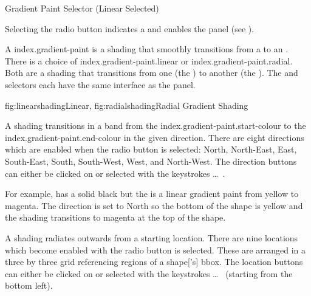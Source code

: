 
{}
{Gradient Paint Selector (Linear Selected)}

Selecting the  radio button indicates a 
 and enables the
 panel (see
). 

A \gls{index.gradient-paint} is a shading that smoothly transitions
from a  to an
.  There is a choice
of \gls{index.gradient-paint.linear} or
\gls{index.gradient-paint.radial}. Both are a shading that
transitions from one  (the
) to another (the
).  The
 and  selectors
each have the same interface as the  panel.

{
 {fig:linearshading}{}{Linear},
 {fig:radialshading}{}{Radial}
}
{Gradient Shading}


A  shading transitions in
a band from the \gls{index.gradient-paint.start-colour} to the
\gls{index.gradient-paint.end-colour} in the given direction. There
are eight directions which are enabled when the
 radio button is selected: North, North-East,
East, South-East, South, South-West, West, and North-West.  The
direction buttons can either be clicked on or selected with the
keystrokes  \ldots\
.

For example,  has a solid black
 but the  is a linear
gradient paint from yellow to magenta. The direction is set to North
so the bottom of the shape is yellow and the shading transitions to
magenta at the top of the shape.


A  shading radiates
outwards from a starting location. There are nine locations which
become enabled with the \widget{colour.radial} radio button is
selected. These are arranged in a three by three grid referencing
regions of a \gls*{shape}['s] \gls{bbox}.
The location buttons can either be clicked on or
selected with the keystrokes  \ldots\
 (starting from the bottom left).


